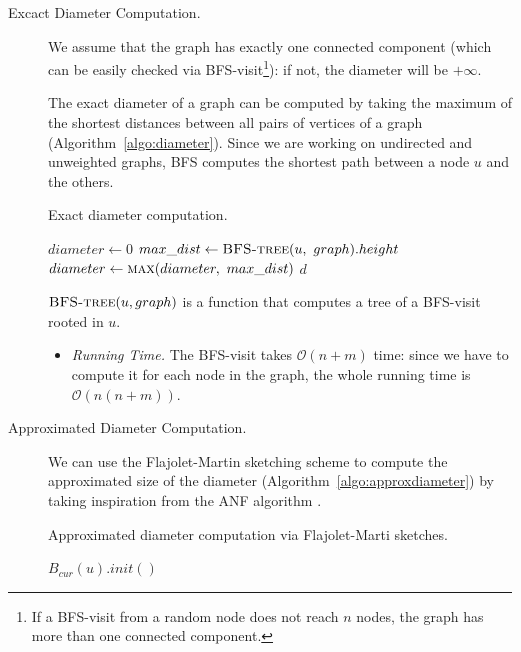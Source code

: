 \documentclass[12pt,a4paper]{article}
\begin{document}
\begin{description}

\item[Excact Diameter Computation.] We assume that the graph has  exactly one connected component (which can be easily checked via \textsc{BFS}-visit\footnote{If a BFS-visit from a random node does not reach $n$ nodes, the graph has more than one connected component.}): if not, the diameter will be $+\infty$.

The exact diameter of a graph can be computed by taking the maximum of the shortest distances between all pairs of vertices of a graph (Algorithm~\ref{algo:diameter}). Since we are working on undirected and unweighted graphs, BFS computes the shortest path between a node $u$ and the others.

\begin{algorithm}
\caption{Exact diameter computation.}\label{algo:diameter}
\begin{algorithmic}[1]
\State $diameter \gets 0$
\State $max\_dist \gets \textsc{BFS-tree}(u,\ graph).height$
\State $diameter \gets \textsc{max}(diameter,\ max\_dist)$
\EndFor
\State \Return $d$
\EndFunction
\end{algorithmic}
\end{algorithm}
$\textsc{BFS-tree}(u, graph)$ is a function that computes a tree of a BFS-visit rooted in $u$.
\begin{itemize}

\item \textit{Running Time.} The \textsc{BFS}-visit takes $\mathcal{O}(n + m)$ time: since we have to compute it for each node in the graph, the whole running time is  $\mathcal{O}(n(n + m))$.

\end{itemize}


\item[Approximated Diameter Computation.] We can use the Flajolet-Martin sketching scheme to compute the approximated size of the diameter (Algorithm~\ref{algo:approxdiameter}) by taking inspiration from the ANF algorithm \cite{palmer2002anf}.


\begin{algorithm}
\caption{Approximated diameter computation via Flajolet-Marti sketches.}\label{algo:approxdiameter}
\begin{algorithmic}[1]

  	\State $B_{cur}(u).init()$
  \EndFor
  

\end{algorithmic}
\end{algorithm}
\end{description}
\end{document}
